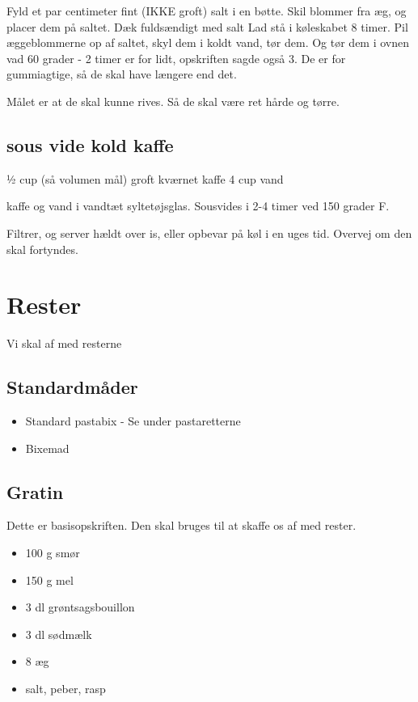 \documentclass[
]{book}
\providecommand{\tightlist}{%
  \setlength{\itemsep}{0pt}\setlength{\parskip}{0pt}}
\begin{document}
Fyld et par centimeter fint (IKKE groft) salt i en bøtte.
Skil blommer fra æg, og placer dem på saltet. Dæk fuldsændigt med salt
Lad stå i køleskabet 8 timer.
Pil æggeblommerne op af saltet, skyl dem i koldt vand, tør dem. Og
tør dem i ovnen vad 60 grader - 2 timer er for lidt, opskriften sagde også 3.
De er for gummiagtige, så de skal have længere end det.

Målet er at de skal kunne rives. Så de skal være ret hårde og tørre.

\hypertarget{sous-vide-kold-kaffe}{%
\section{sous vide kold kaffe}\label{sous-vide-kold-kaffe}}

½ cup (så volumen mål) groft kværnet kaffe
4 cup vand

kaffe og vand i vandtæt syltetøjsglas. Sousvides i 2-4 timer ved 150 grader F.

Filtrer, og server hældt over is, eller opbevar på køl i en uges tid.
Overvej om den skal fortyndes.

\hypertarget{rester}{%
\chapter{Rester}\label{rester}}

Vi skal af med resterne

\hypertarget{standardmuxe5der}{%
\section{Standardmåder}\label{standardmuxe5der}}

\begin{itemize}
\tightlist
\item
  Standard pastabix - Se under pastaretterne
\item
  Bixemad
\end{itemize}

\hypertarget{gratin}{%
\section{Gratin}\label{gratin}}

Dette er basisopskriften. Den skal bruges til at skaffe os af med rester.

\begin{itemize}
\tightlist
\item
  100 g smør
\item
  150 g mel
\item
  3 dl grøntsagsbouillon
\item
  3 dl sødmælk
\item
  8 æg
\item
  salt, peber, rasp
\end{itemize}
\end{document}
